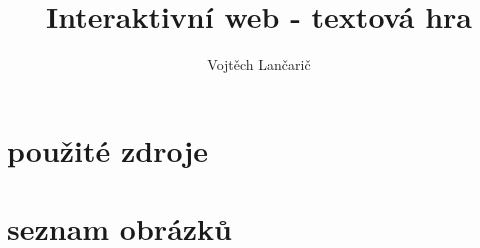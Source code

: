 \documentclass{article}
\title{Interaktivní web - textová hra}
\author{Vojtěch Lančarič}
\begin{document}
\maketitle

\newpage %

\newpage

\newpage

\newpage


\newpage
%
%




\newpage

\section{použité zdroje}

\newpage
\section{seznam obrázků}
\end{document}
